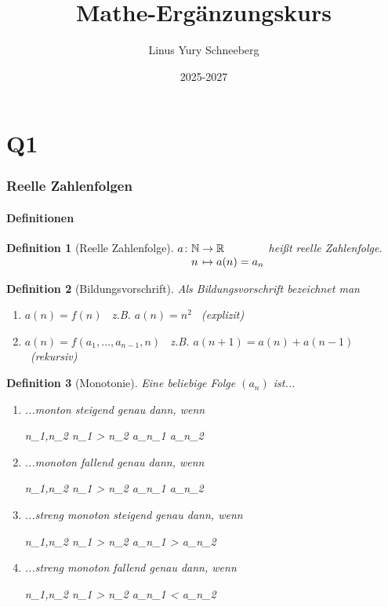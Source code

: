 \documentclass{article}
\title{Mathe-Ergänzungskurs}
\author{Linus Yury Schneeberg}
\date{2025-2027}
\newcommand\func[5]{%
	\begingroup
	\setlength\arraycolsep{0pt}
	#1\colon\begin{array}[t]{l >{{}}c<{{}} l}
		#2 & \to & #3 \\ #4 & \mapsto & #5 
	\end{array}%
	\endgroup}
\newtheorem{defn}{Definition}[section]
\newenvironment{aleq*}{\begin{equation*}\begin{aligned}}{\end{aligned}\end{equation*}}
\begin{document}
	\maketitle
	\tableofcontents
	\newpage
	
	\part{Q1}
	\section{Reelle Zahlenfolgen}
	\subsection{Definitionen}
	\begin{defn}[Reelle Zahlenfolge]
		\quad\newline
	\(\func{a}{\mathbb{N}}{\mathbb{R}}{n}{a(n)=a_n}\) heißt reelle Zahlenfolge.
	\end{defn}
	\begin{defn}[Bildungsvorschrift]
		Als Bildungsvorschrift bezeichnet man 
		\begin{enumerate}[label=(\alph*)]
			\item \(a(n) = f(n)\) \ z.B. \(a(n) = n^2\) \ (explizit)
			\item \(a(n) = f(a_1, \dots, a_{n-1}, n)\) \ z.B. \(a(n+1) = a(n) + a(n-1)\) \ (rekursiv)
		\end{enumerate}
	\end{defn}
	
	\begin{defn}[Monotonie]
		\label{defMonotonie}
	Eine beliebige Folge \((a_n)\) ist...
	\begin{enumerate}
		\item ...monton steigend genau dann, wenn
		\begin{aleq*}
			\forall n_1,n_2 \in {} \colon n_1 > n_2 \implies a_{n_1} \geq a_{n_2} 
		\end{aleq*}
		
		\item ...monoton fallend genau dann, wenn
		\begin{aleq*}
			\forall n_1,n_2 \in {} \colon n_1 > n_2 \implies a_{n_1} \leq a_{n_2} \text{.}
		\end{aleq*}
		
		\item ...streng monoton steigend genau dann, wenn
		\begin{aleq*}
			\forall n_1,n_2 \in {} \colon n_1 > n_2 \implies a_{n_1} > a_{n_2} 
		\end{aleq*}
		
		\item ...streng monoton fallend genau dann, wenn
		\begin{aleq*}
			\forall n_1,n_2 \in {} \colon n_1 > n_2 \implies a_{n_1} < a_{n_2} \text{.}
		\end{aleq*}
	\end{enumerate}
	\end{defn}
	
\end{document}
